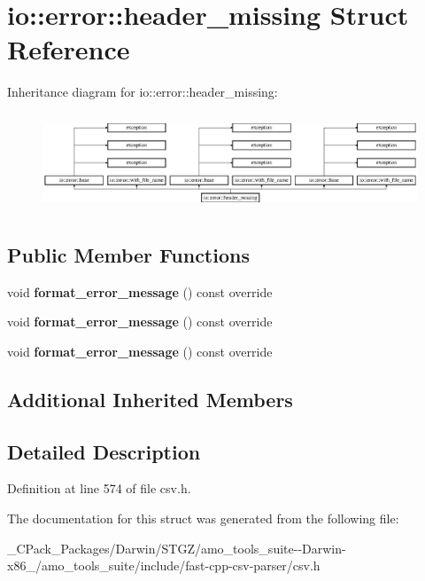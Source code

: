 \hypertarget{structio_1_1error_1_1header__missing}{}\section{io\+:\+:error\+:\+:header\+\_\+missing Struct Reference}
\label{structio_1_1error_1_1header__missing}
Inheritance diagram for io\+:\+:error\+:\+:header\+\_\+missing\+:\begin{figure}[H]
\begin{center}
\leavevmode
\includegraphics[height=2.935010cm]{dd/dd7/structio_1_1error_1_1header__missing}
\end{center}
\end{figure}
\subsection*{Public Member Functions}
\begin{DoxyCompactItemize}
\item 
\mbox{\label{structio_1_1error_1_1header__missing_aa070a7455a7f3ff10eeec9e373cfb6e9}} 
void {\bfseries format\+\_\+error\+\_\+message} () const override
\item 
\mbox{\label{structio_1_1error_1_1header__missing_aa070a7455a7f3ff10eeec9e373cfb6e9}} 
void {\bfseries format\+\_\+error\+\_\+message} () const override
\item 
\mbox{\label{structio_1_1error_1_1header__missing_aa070a7455a7f3ff10eeec9e373cfb6e9}} 
void {\bfseries format\+\_\+error\+\_\+message} () const override
\end{DoxyCompactItemize}
\subsection*{Additional Inherited Members}


\subsection{Detailed Description}


Definition at line 574 of file csv.\+h.



The documentation for this struct was generated from the following file\+:\begin{DoxyCompactItemize}
\item 
\+\_\+\+C\+Pack\+\_\+\+Packages/\+Darwin/\+S\+T\+G\+Z/amo\+\_\+tools\+\_\+suite-\/-\/\+Darwin-\/x86\+\_/amo\+\_\+tools\+\_\+suite/include/fast-\/cpp-\/csv-\/parser/csv.\+h\end{DoxyCompactItemize}
